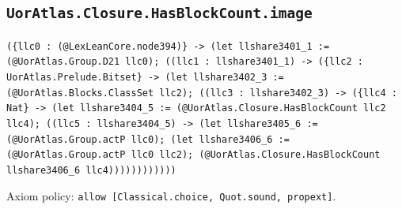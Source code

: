\documentclass[11pt]{article}
\begin{document}
\subsection*{\texttt{UorAtlas.Closure.HasBlockCount.image}}
\noindent\texttt{(\{llc0 : (@LexLeanCore.node394)\} -> (let llshare3401\_1 := (@UorAtlas.Group.D21 llc0); ((llc1 : llshare3401\_1) -> (\{llc2 : UorAtlas.Prelude.Bitset\} -> (let llshare3402\_3 := (@UorAtlas.Blocks.ClassSet llc2); ((llc3 : llshare3402\_3) -> (\{llc4 : Nat\} -> (let llshare3404\_5 := (@UorAtlas.Closure.HasBlockCount llc2 llc4); ((llc5 : llshare3404\_5) -> (let llshare3405\_6 := (@UorAtlas.Group.actP llc0); (let llshare3406\_6 := (@UorAtlas.Group.actP llc0 llc2); (@UorAtlas.Closure.HasBlockCount llshare3406\_6 llc4))))))))))))}\par
\noindent Axiom policy: \texttt{allow [Classical.choice, Quot.sound, propext]}.\par
\end{document}
